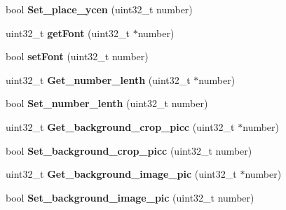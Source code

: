 \begin{DoxyCompactItemize}
\item 
\hypertarget{class_nex_number_a05aa6572aabe07b48c1b0675904aaadd}{bool {\bfseries Set\+\_\+place\+\_\+ycen} (uint32\+\_\+t number)}\label{class_nex_number_a05aa6572aabe07b48c1b0675904aaadd}

\item 
\hypertarget{class_nex_number_a8ccd35555397e828cf8b1f0a8e9ba294}{uint32\+\_\+t {\bfseries get\+Font} (uint32\+\_\+t $\ast$number)}\label{class_nex_number_a8ccd35555397e828cf8b1f0a8e9ba294}

\item 
\hypertarget{class_nex_number_aed567aef79411c5457c81be272218439}{bool {\bfseries set\+Font} (uint32\+\_\+t number)}\label{class_nex_number_aed567aef79411c5457c81be272218439}

\item 
\hypertarget{class_nex_number_a0dfc73db91229f114e502bc14084e711}{uint32\+\_\+t {\bfseries Get\+\_\+number\+\_\+lenth} (uint32\+\_\+t $\ast$number)}\label{class_nex_number_a0dfc73db91229f114e502bc14084e711}

\item 
\hypertarget{class_nex_number_a045519a466875775d561e54176c459ad}{bool {\bfseries Set\+\_\+number\+\_\+lenth} (uint32\+\_\+t number)}\label{class_nex_number_a045519a466875775d561e54176c459ad}

\item 
\hypertarget{class_nex_number_a9772a6717c19c5a03ea0e33ff71492d9}{uint32\+\_\+t {\bfseries Get\+\_\+background\+\_\+crop\+\_\+picc} (uint32\+\_\+t $\ast$number)}\label{class_nex_number_a9772a6717c19c5a03ea0e33ff71492d9}

\item 
\hypertarget{class_nex_number_a410bd4092a5874541da654edd86a01eb}{bool {\bfseries Set\+\_\+background\+\_\+crop\+\_\+picc} (uint32\+\_\+t number)}\label{class_nex_number_a410bd4092a5874541da654edd86a01eb}

\item 
\hypertarget{class_nex_number_a9f235a8929b4f6c282511c04c88216c1}{uint32\+\_\+t {\bfseries Get\+\_\+background\+\_\+image\+\_\+pic} (uint32\+\_\+t $\ast$number)}\label{class_nex_number_a9f235a8929b4f6c282511c04c88216c1}

\item 
\hypertarget{class_nex_number_aa45acacbde526fce04c699104114d1f1}{bool {\bfseries Set\+\_\+background\+\_\+image\+\_\+pic} (uint32\+\_\+t number)}\label{class_nex_number_aa45acacbde526fce04c699104114d1f1}

\end{DoxyCompactItemize}
